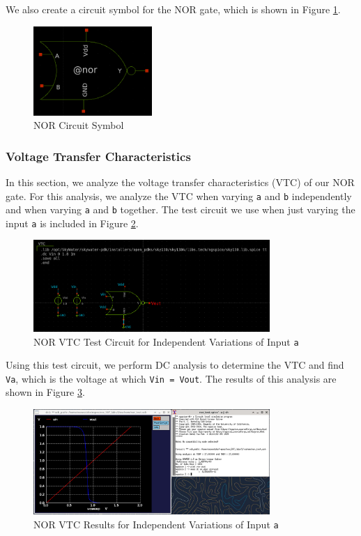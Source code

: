\documentclass[fleqn]{article}
\begin{document}
	We also create a circuit symbol for the NOR gate, which is shown in Figure \ref{fig::nor_symbol}.
	
	\begin{figure}[H]
		\centerline{\includegraphics[width=0.4\textwidth]{nor_symbol.png}}
		\caption{NOR Circuit Symbol}
		\label{fig::nor_symbol}
	\end{figure}

	\subsubsection{Voltage Transfer Characteristics}
	
	In this section, we analyze the voltage transfer characteristics (VTC) of our NOR gate. For this analysis, we analyze the VTC when varying \texttt{a} and \texttt{b} independently and when varying \texttt{a} and \texttt{b} together. The test circuit we use when just varying the input \texttt{a} is included in Figure \ref{fig::nor_vtc_test_sweep_va}.
	
	\begin{figure}[H]
		\centerline{\includegraphics[width=0.8\textwidth]{nor_vtc_test_sweep_va.png}}
		\caption{NOR VTC Test Circuit for Independent Variations of Input \texttt{a}}
		\label{fig::nor_vtc_test_sweep_va}
	\end{figure}
	
	Using this test circuit, we perform DC analysis to determine the VTC and find \texttt{Va}, which is the voltage at which \texttt{Vin = Vout}. The results of this analysis are shown in Figure \ref{fig::nor_vtc_sweep_va}.
	
	\begin{figure}[H]
		\centerline{\includegraphics[width=0.8\textwidth]{nor_vtc_sweep_va.png}}
		\caption{NOR VTC Results for Independent Variations of Input \texttt{a}}
		\label{fig::nor_vtc_sweep_va}
	\end{figure}
	
\end{document}
